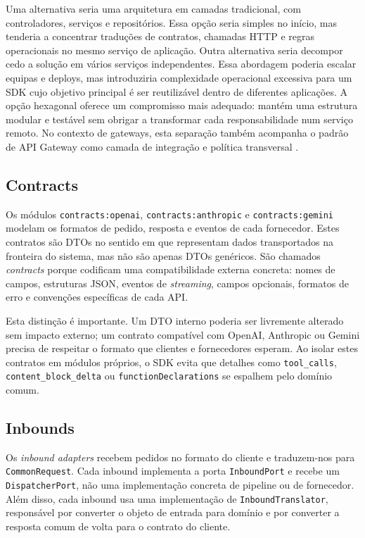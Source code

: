 \documentclass[11pt,a4paper]{report}
\begin{document}
    Uma alternativa seria uma arquitetura em camadas tradicional, com controladores, serviços e repositórios. Essa opção seria simples no início, mas tenderia a concentrar traduções de contratos, chamadas HTTP e regras operacionais no mesmo serviço de aplicação. Outra alternativa seria decompor cedo a solução em vários serviços independentes. Essa abordagem poderia escalar equipas e deploys, mas introduziria complexidade operacional excessiva para um SDK cujo objetivo principal é ser reutilizável dentro de diferentes aplicações. A opção hexagonal oferece um compromisso mais adequado: mantém uma estrutura modular e testável sem obrigar a transformar cada responsabilidade num serviço remoto. No contexto de gateways, esta separação também acompanha o padrão de API Gateway como camada de integração e política transversal \cite{api_gateway_design,ai_gateway_pattern,karl_ai_gateway}.

    \subsection{Contracts}
    Os módulos \texttt{contracts:openai}, \texttt{contracts:anthropic} e \texttt{contracts:gemini} modelam os formatos de pedido, resposta e eventos de cada fornecedor. Estes contratos são DTOs no sentido em que representam dados transportados na fronteira do sistema, mas não são apenas DTOs genéricos. São chamados \textit{contracts} porque codificam uma compatibilidade externa concreta: nomes de campos, estruturas JSON, eventos de \textit{streaming}, campos opcionais, formatos de erro e convenções específicas de cada API.

    Esta distinção é importante. Um DTO interno poderia ser livremente alterado sem impacto externo; um contrato compatível com OpenAI, Anthropic ou Gemini precisa de respeitar o formato que clientes e fornecedores esperam. Ao isolar estes contratos em módulos próprios, o SDK evita que detalhes como \texttt{tool\_calls}, \texttt{content\_block\_delta} ou \texttt{functionDeclarations} se espalhem pelo domínio comum.

    \subsection{Inbounds}
    Os \textit{inbound adapters} recebem pedidos no formato do cliente e traduzem-nos para \texttt{CommonRequest}. Cada inbound implementa a porta \texttt{InboundPort} e recebe um \texttt{DispatcherPort}, não uma implementação concreta de pipeline ou de fornecedor. Além disso, cada inbound usa uma implementação de \texttt{InboundTranslator}, responsável por converter o objeto de entrada para domínio e por converter a resposta comum de volta para o contrato do cliente.
\end{document}
